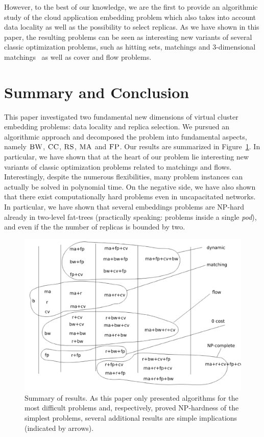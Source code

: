 \documentclass[9pt,twocolumn]{scrartcl}
\newcommand{\CC}{\textsc{CC}}
\newcommand{\FP}{\textsc{FP}}
\newcommand{\RS}{\textsc{RS}}
\newcommand{\BW}{\textsc{BW}}
\newcommand{\MA}{\textsc{MA}}
\begin{document}
However, to the best of our knowledge, we are the first to provide an algorithmic
study of the cloud application embedding problem which also takes into account
data locality as well as the possibility to select replicas. As we have shown in this paper,
the resulting problems can be seen as interesting new variants of several classic optimization
problems, such as hitting sets, matchings and 3-dimensional matchings~\cite{3SC-hard} as well as cover and flow problems.~\cite{korte2002combinatorial}


\section{Summary and Conclusion}\label{sec:conclusion}

This paper investigated two fundamental new dimensions of virtual cluster
embedding problems: data locality and replica selection. We pursued
an algorithmic approach and decomposed the problem into fundamental aspects,
namely $\BW$, $\CC$, $\RS$, $\MA$ and $\FP$. Our results are summarized in
Figure~\ref{fig:summary}.
In particular, we have shown that
at the heart of our problem lie interesting new variants of classic
optimization problems related to matchings and flows. Interestingly, despite the
numerous
flexibilities, many problem instances can actually be solved in polynomial time.
On the negative side, we have also shown that there exist computationally hard
problems even in uncapacitated networks. In particular,
we have shown that several embeddings problems are NP-hard already in two-level fat-trees (practically speaking:
problems inside a single \emph{pod}), and even if the the number of replicas is bounded by two.


\begin{figure}[t]
\includegraphics[width = \columnwidth]{figs/summary}
\caption{Summary of results. As this paper only presented algorithms for the most
difficult problems and, respectively, proved NP-hardness of the simplest
problems, several additional results are simple implications (indicated by arrows).}
\label{fig:summary}
\end{figure}
\end{document}
